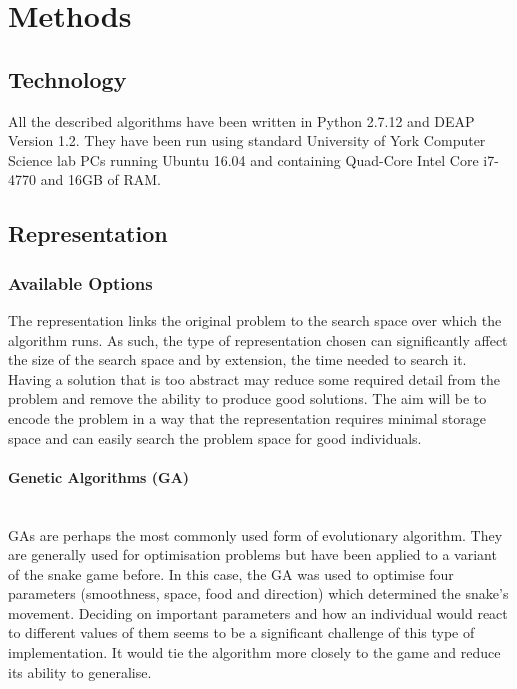 \documentclass[12pt]{article}
\newcommand{\myparagraph}[1]{\paragraph{#1}\mbox{}\\}
\begin{document}
\section{Methods} %
\subsection{Technology}
All the described algorithms have been written in Python 2.7.12 and DEAP Version 1.2. They have been run using standard University of York Computer Science lab PCs running Ubuntu 16.04 and containing Quad-Core Intel Core i7-4770 and 16GB of RAM.

\subsection{Representation}
\subsubsection{Available Options}
The representation links the original problem to the search space over which the algorithm runs. As such, the type of representation chosen can significantly affect the size of the search space and by extension, the time needed to search it. Having a solution that is too abstract may reduce some required detail from the problem and remove the ability to produce good solutions. %
The aim will be to encode the problem in a way that the representation requires minimal storage space and can easily search the problem space for good individuals. 

\myparagraph{Genetic Algorithms (GA)}
GAs are perhaps the most commonly used form of evolutionary algorithm. They are generally used for optimisation problems but have been applied to a variant of the snake game before\cite{snake_paper}. In this case, the GA was used to optimise four parameters (smoothness, space, food and direction) which determined the snake's movement. Deciding on important parameters and how an individual would react to different values of them seems to be a significant challenge of this type of implementation. It would tie the algorithm more closely to the game and reduce its ability to generalise.
\end{document}
